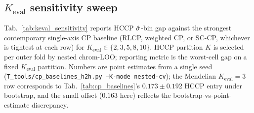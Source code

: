 \subsection{$K_{\mathrm{eval}}$ sensitivity sweep}
\label{app:tables:keval_sensitivity}

Tab.~\ref{tab:keval_sensitivity} reports HCCP $\hat{\sigma}$-bin gap against the strongest contemporary single-axis CP baseline (RLCP, weighted CP, or SC-CP, whichever is tightest at each row) for $K_{\mathrm{eval}} \in \{2, 3, 5, 8, 10\}$. HCCP partition $K$ is selected per outer fold by nested chrom-LOO; reporting metric is the worst-cell gap on a fixed $K_{\mathrm{eval}}$ partition. Numbers are point estimates from a single seed (\texttt{T\_tools/cp\_baselines\_h2h.py --K-mode nested-cv}); the Mendelian $K_{\mathrm{eval}} = 3$ row corresponds to Tab.~\ref{tab:cp_baselines}'s $0.173 \pm 0.192$ HCCP entry under bootstrap, and the small offset ($0.163$ here) reflects the bootstrap-vs-point-estimate discrepancy.

